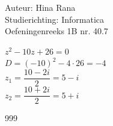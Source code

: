 \documentclass[a4paper]{article}
\begin{document}
\noindent \large Auteur: Hina Rana \\
\noindent \large Studierichting: Informatica\\
\noindent \large Oefeningenreeks 1B nr. 40.7\\
\medskip
\normalsize

$z^2-10z+26=0$\\

$D = (-10)^2 - 4 \cdot 26 = -4$\\

$z_1 = \dfrac{10-2i}{2} = 5-i$\\

$z_2 = \dfrac{10+2i}{2} = 5+i$\\

\begin{thebibliography}{999}
\end{thebibliography}
\end{document}
